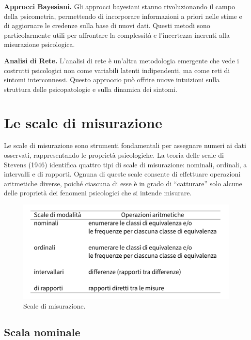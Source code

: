 \documentclass[
  letterpaper,
]{krantz}
\begin{document}
\textbf{Approcci Bayesiani.} Gli approcci bayesiani stanno
rivoluzionando il campo della psicometria, permettendo di incorporare
informazioni a priori nelle stime e di aggiornare le credenze sulla base
di nuovi dati. Questi metodi sono particolarmente utili per affrontare
la complessità e l'incertezza inerenti alla misurazione psicologica.

\textbf{Analisi di Rete.} L'analisi di rete è un'altra metodologia
emergente che vede i costrutti psicologici non come variabili latenti
indipendenti, ma come reti di sintomi interconnessi. Questo approccio
può offrire nuove intuizioni sulla struttura delle psicopatologie e
sulla dinamica dei sintomi.

\section{Le scale di misurazione}\label{le-scale-di-misurazione}

Le scale di misurazione sono strumenti fondamentali per assegnare numeri
ai dati osservati, rappresentando le proprietà psicologiche. La teoria
delle scale di Stevens (1946) identifica quattro tipi di scale di
misurazione: nominali, ordinali, a intervalli e di rapporti. Ognuna di
queste scale consente di effettuare operazioni aritmetiche diverse,
poiché ciascuna di esse è in grado di ``catturare'' solo alcune delle
proprietà dei fenomeni psicologici che si intende misurare.

\begin{figure}[H]

{\centering \includegraphics[width=0.7\linewidth,height=\textheight,keepaspectratio]{chapters/key_notions/../../figures/misurazione_2.png}

}

\caption{Scale di misurazione.}

\end{figure}%

\subsection{Scala nominale}\label{scala-nominale}
\end{document}
